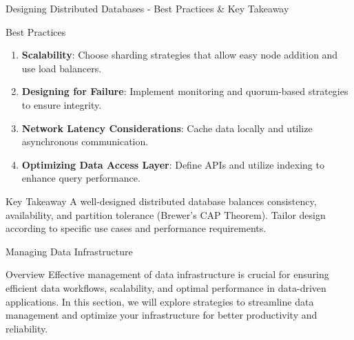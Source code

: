 \documentclass[aspectratio=169]{beamer}
\begin{document}
\begin{frame}[fragile]{Designing Distributed Databases - Best Practices & Key Takeaway}
    \begin{block}{Best Practices}
        \begin{enumerate}
            \item \textbf{Scalability}: Choose sharding strategies that allow easy node addition and use load balancers.
            \item \textbf{Designing for Failure}: Implement monitoring and quorum-based strategies to ensure integrity.
            \item \textbf{Network Latency Considerations}: Cache data locally and utilize asynchronous communication.
            \item \textbf{Optimizing Data Access Layer}: Define APIs and utilize indexing to enhance query performance.
        \end{enumerate}
    \end{block}

    \begin{block}{Key Takeaway}
        A well-designed distributed database balances consistency, availability, and partition tolerance (Brewer's CAP Theorem). Tailor design according to specific use cases and performance requirements.
    \end{block}
\end{frame}

\begin{frame}[fragile]{Managing Data Infrastructure}
  \begin{block}{Overview}
    Effective management of data infrastructure is crucial for ensuring efficient data workflows, scalability, and optimal performance in data-driven applications. In this section, we will explore strategies to streamline data management and optimize your infrastructure for better productivity and reliability.
  \end{block}
\end{frame}
\end{document}
